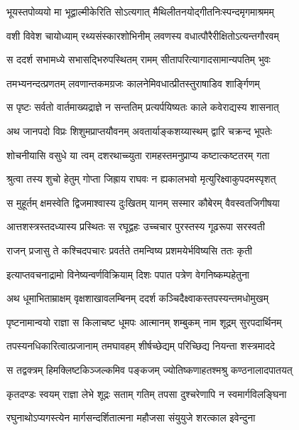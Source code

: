 \twolineshloka
{भूयस्तपोव्ययो मा भूद्वाल्मीकेरिति सोऽत्यगात्}
{मैथिलीतनयोद्गीतनिःस्पन्दमृगमाश्रमम्} %

\twolineshloka
{वशी विवेश चायोध्याम् रथ्यसंस्कारशोभिनीम्}
{लवणस्य वधात्पौरैरीक्षितोऽत्यन्तगौरवम्} %

\twolineshloka
{स ददर्श सभामध्ये सभासद्भिरुपस्थितम्}
{रामम् सीतापरित्यागादसामान्यपतिम् भुवः} %

\twolineshloka
{तमभ्यनन्दत्प्रणतम् लवणान्तकमग्रजः}
{कालनेमिवधात्प्रीतस्तुराषाडिव शार्ङ्गिणम्} %

\twolineshloka
{स पृष्टः सर्वतो वार्तमाख्यद्राज्ञे न सन्ततिम्}
{प्रत्यर्पयिष्यतः काले कवेराद्यस्य शासनात्} %

\twolineshloka
{अथ जानपदो विप्रः शिशुमप्राप्तयौवनम्}
{अवतार्याङ्कशय्यास्थम् द्वारि चक्रन्द भूपतेः} %

\twolineshloka
{शोचनीयासि वसुधे या त्वम् दशरथाच्च्युता}
{रामहस्तमनुप्राप्य कष्टात्कष्टतरम् गता} %

\twolineshloka
{श्रुत्वा तस्य शुचो हेतुम् गोप्ता जिह्राय राघवः}
{न ह्यकालभवो मृत्युरिक्ष्वाकुपदमस्पृशत्} %

\twolineshloka
{स मुहूर्तम् क्षमस्वेति द्विजमाश्वास्य दुःखितम्}
{यानम् सस्मार कौबेरम् वैवस्वतजिगीषया} %

\twolineshloka
{आत्तशस्त्रस्तदध्यास्य प्रस्थितः स रघूद्वहः}
{उच्चचार पुरस्तस्य गूढरूपा सरस्वती} %

\twolineshloka
{राजन् प्रजासु ते कश्चिदपचारः प्रवर्तते}
{तमन्विष्य प्रशमयेर्भविष्यसि ततः कृती} %

\twolineshloka
{इत्याप्तवचनाद्रामो विनेष्यन्वर्णविक्रियाम्}
{दिशः पपात पत्रेण वेगनिष्कम्पहेतुना} %

\twolineshloka
{अथ धूमाभिताम्राक्षम् वृक्षशाखावलम्बिनम्}
{ददर्श कञ्चिदैक्ष्वाकस्तपस्यन्तमधोमुखम्} %

\twolineshloka
{पृष्टनामान्वयो राज्ञा स किलाचष्ट धूमपः}
{आत्मानम् शम्बुकम् नाम शूद्रम् सुरपदार्थिनम्} %

\twolineshloka
{तपस्यनधिकारित्वात्प्रजानाम् तमघावहम्}
{शीर्षच्छेद्यम् परिच्छिद्य नियन्ता शस्त्रमाददे} %

\twolineshloka
{स तद्वक्त्रम् हिमक्लिष्टकिञ्जल्कमिव पङ्कजम्}
{ज्योतिष्कणाहतश्मश्रु कण्ठनालादपातयत्} %

\twolineshloka
{कृतदण्डः स्वयम् राज्ञा लेभे शूद्रः सताम् गतिम्}
{तपसा दुश्चरेणापि न स्वमार्गविलङ्घिना} %

\twolineshloka
{रघुनाथोऽप्यगस्त्येन मार्गसन्दर्शितात्मना}
{महौजसा संयुयुजे शरत्काल इवेन्दुना} %

